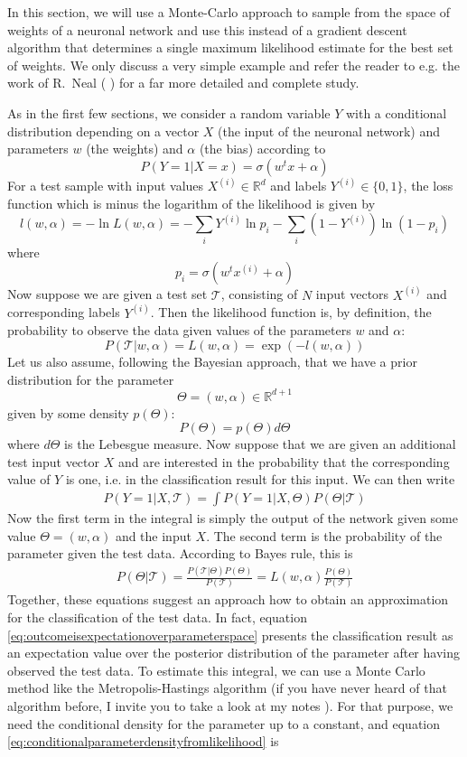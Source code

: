 \documentclass[a4paper, draft]{report}
\numberwithin{section}{chapter}
\numberwithin{equation}{chapter}
\theoremstyle{own}
\theoremstyle{remark}
\newcommand{\R}{\mathbb{R}}
\begin{document}
In this section, we will use a Monte-Carlo approach to sample from the space of weights of a neuronal network and use this instead of a gradient descent algorithm that determines a single maximum likelihood estimate for the best set of weights. We only discuss a very simple example and refer the reader to e.g. the work of R.~Neal (\cite{Neal1996} ) for a far more detailed and complete study.

As in the first few sections, we consider a random variable $Y$ with a conditional distribution depending on a vector $X$ (the input of the neuronal network)
and parameters $w$ (the weights) and $\alpha$ (the bias) according to
$$
P(Y = 1 | X = x) = \sigma(w^t x + \alpha)
$$
For a test sample with input values $X^{(i)} \in \R^d$ and labels $Y^{(i)} \in 
\{ 0,1 \}$, the loss function which is minus the logarithm of the likelihood  is given by
$$
l(w, \alpha) = - \ln L(w,\alpha) = -\sum_i Y^{(i)} \ln p_i - 
\sum_i (1-Y^{(i)}) \ln (1-p_i)
$$
where 
$$
p_i = \sigma(w^t x^{(i)} + \alpha)
$$
Now suppose we are given a test set ${\mathcal T}$, consisting of $N$ input vectors 
$X^{(i)}$ and corresponding labels $Y^{(i)}$. Then the likelihood function is, by definition, the probability to observe the data given values of the parameters $w$ and $\alpha$:
$$
P({\mathcal T} | w,\alpha) = L(w,\alpha) = \exp(-l(w,\alpha))
$$
Let us also assume, following the Bayesian approach, that we have a prior distribution for the parameter
$$
\Theta = (w,\alpha) \in \R^{d+1}
$$
given by some density $p(\Theta)$:
$$
P(\Theta) = p(\Theta) d\Theta
$$
where $d \Theta$ is the Lebesgue measure. Now suppose that we are given an additional test input vector $X$ and are interested in the probability that the corresponding value of $Y$ is one, i.e. in the classification result for this input. We can then write
\begin{align}\label{eq:outcomeisexpectationoverparameterspace}
P(Y=1 | X, {\mathcal T}) = \int P(Y=1 | X, \Theta) P(\Theta | {\mathcal  T}) 
\end{align}
Now the first term in the integral is simply the output of the network given some value $\Theta = (w,\alpha)$ and the input $X$. The second term is the probability of the 
parameter given the test data. According to Bayes rule, this is
\begin{align}\label{eq:conditionalparameterdensityfromlikelihood}
P(\Theta | {\mathcal T}) =
\frac{P({\mathcal T} | \Theta) P(\Theta)}{P({\mathcal T})}
= L(w,\alpha) \frac{P(\Theta)}{P({\mathcal T})}
\end{align}
Together, these equations suggest an approach how to obtain an approximation for the classification of the test data. In fact, equation \ref{eq:outcomeisexpectationoverparameterspace} presents the classification result as an expectation value over the posterior distribution of the parameter after having observed the test data. To estimate this integral, we can use a Monte Carlo method like the Metropolis-Hastings algorithm (if you have never heard of that algorithm before, I invite you to take a look at my notes \cite{christianb2018}). For that purpose, we need the conditional density for the parameter up to a constant, and equation \ref{eq:conditionalparameterdensityfromlikelihood} is
\end{document}
